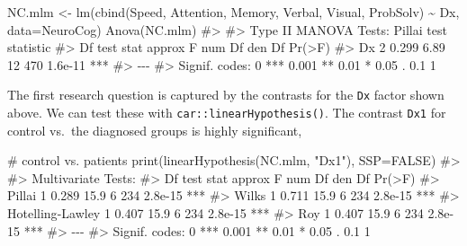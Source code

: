 \documentclass[
  letterpaper,
  10pt,
  krantz2]{krantz}
\makeatletter
\newenvironment{Shaded}{\begin{snugshade}}{\end{snugshade}}
\newcommand{\AttributeTok}[1]{\textcolor[rgb]{0.40,0.45,0.13}{#1}}
\newcommand{\CommentTok}[1]{\textcolor[rgb]{0.37,0.37,0.37}{#1}}
\newcommand{\ConstantTok}[1]{\textcolor[rgb]{0.56,0.35,0.01}{#1}}
\newcommand{\FunctionTok}[1]{\textcolor[rgb]{0.28,0.35,0.67}{#1}}
\newcommand{\NormalTok}[1]{\textcolor[rgb]{0.00,0.23,0.31}{#1}}
\newcommand{\OtherTok}[1]{\textcolor[rgb]{0.00,0.23,0.31}{#1}}
\newcommand{\SpecialCharTok}[1]{\textcolor[rgb]{0.37,0.37,0.37}{#1}}
\newcommand{\StringTok}[1]{\textcolor[rgb]{0.13,0.47,0.30}{#1}}
\newenvironment{kframe}{%
  \medskip{}
  \setlength{\fboxsep}{.8em}
  \def\at@end@of@kframe{}%
  \ifinner\ifhmode%
  \def\at@end@of@kframe{\end{minipage}}%
  \begin{minipage}{\columnwidth}%
  \fi\fi%
  \def\FrameCommand##1{\hskip\@totalleftmargin \hskip-\fboxsep
  \colorbox{shadecolor}{##1}\hskip-\fboxsep
      \hskip-\linewidth \hskip-\@totalleftmargin \hskip\columnwidth}%
  \MakeFramed {\advance\hsize-\width
    \@totalleftmargin\z@ \linewidth\hsize
    \@setminipage}}%
{\par\unskip\endMakeFramed%
  \at@end@of@kframe}
\renewenvironment{Shaded}{\begin{kframe}}{\end{kframe}}
\makeatother
\begin{document}
\begin{Shaded}
\begin{Highlighting}[]
\NormalTok{NC.mlm }\OtherTok{\textless{}{-}} \FunctionTok{lm}\NormalTok{(}\FunctionTok{cbind}\NormalTok{(Speed, Attention, Memory, Verbal, Visual, ProbSolv) }\SpecialCharTok{\textasciitilde{}}\NormalTok{ Dx,}
             \AttributeTok{data=}\NormalTok{NeuroCog)}
\FunctionTok{Anova}\NormalTok{(NC.mlm)}
\CommentTok{\#\textgreater{} }
\CommentTok{\#\textgreater{} Type II MANOVA Tests: Pillai test statistic}
\CommentTok{\#\textgreater{}    Df test stat approx F num Df den Df  Pr(\textgreater{}F)    }
\CommentTok{\#\textgreater{} Dx  2     0.299     6.89     12    470 1.6e{-}11 ***}
\CommentTok{\#\textgreater{} {-}{-}{-}}
\CommentTok{\#\textgreater{} Signif. codes:  0 \textquotesingle{}***\textquotesingle{} 0.001 \textquotesingle{}**\textquotesingle{} 0.01 \textquotesingle{}*\textquotesingle{} 0.05 \textquotesingle{}.\textquotesingle{} 0.1 \textquotesingle{} \textquotesingle{} 1}
\end{Highlighting}
\end{Shaded}

The first research question is captured by the contrasts for the
\texttt{Dx} factor shown above. We can test these with
\texttt{car::linearHypothesis()}. The contrast \texttt{Dx1} for control
vs.~the diagnosed groups is highly significant,

\begin{Shaded}
\begin{Highlighting}[]
\CommentTok{\# control vs. patients}
\FunctionTok{print}\NormalTok{(}\FunctionTok{linearHypothesis}\NormalTok{(NC.mlm, }\StringTok{"Dx1"}\NormalTok{), }\AttributeTok{SSP=}\ConstantTok{FALSE}\NormalTok{)}
\CommentTok{\#\textgreater{} }
\CommentTok{\#\textgreater{} Multivariate Tests: }
\CommentTok{\#\textgreater{}                  Df test stat approx F num Df den Df  Pr(\textgreater{}F)    }
\CommentTok{\#\textgreater{} Pillai            1     0.289     15.9      6    234 2.8e{-}15 ***}
\CommentTok{\#\textgreater{} Wilks             1     0.711     15.9      6    234 2.8e{-}15 ***}
\CommentTok{\#\textgreater{} Hotelling{-}Lawley  1     0.407     15.9      6    234 2.8e{-}15 ***}
\CommentTok{\#\textgreater{} Roy               1     0.407     15.9      6    234 2.8e{-}15 ***}
\CommentTok{\#\textgreater{} {-}{-}{-}}
\CommentTok{\#\textgreater{} Signif. codes:  0 \textquotesingle{}***\textquotesingle{} 0.001 \textquotesingle{}**\textquotesingle{} 0.01 \textquotesingle{}*\textquotesingle{} 0.05 \textquotesingle{}.\textquotesingle{} 0.1 \textquotesingle{} \textquotesingle{} 1}
\end{Highlighting}
\end{Shaded}
\end{document}
